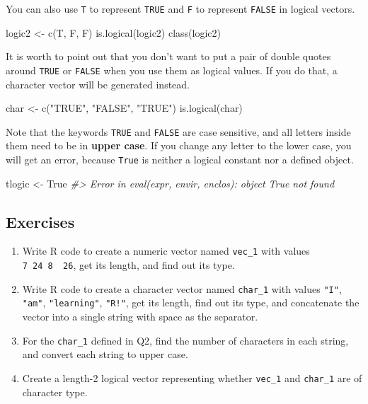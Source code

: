 \documentclass[
]{book}
\newenvironment{Shaded}{\begin{snugshade}}{\end{snugshade}}
\newcommand{\CommentTok}[1]{\textcolor[rgb]{0.56,0.35,0.01}{\textit{#1}}}
\newcommand{\FunctionTok}[1]{\textcolor[rgb]{0.00,0.00,0.00}{#1}}
\newcommand{\NormalTok}[1]{#1}
\newcommand{\OtherTok}[1]{\textcolor[rgb]{0.56,0.35,0.01}{#1}}
\newcommand{\StringTok}[1]{\textcolor[rgb]{0.31,0.60,0.02}{#1}}
\begin{document}
You can also use \texttt{T} to represent \texttt{TRUE} and \texttt{F} to represent \texttt{FALSE} in logical vectors.

\begin{Shaded}
\begin{Highlighting}[]
\NormalTok{logic2 }\OtherTok{\textless{}{-}} \FunctionTok{c}\NormalTok{(T, F, F)}
\FunctionTok{is.logical}\NormalTok{(logic2)}
\FunctionTok{class}\NormalTok{(logic2)}
\end{Highlighting}
\end{Shaded}

It is worth to point out that you don't want to put a pair of double quotes around \texttt{TRUE} or \texttt{FALSE} when you use them as logical values. If you do that, a character vector will be generated instead.

\begin{Shaded}
\begin{Highlighting}[]
\NormalTok{char }\OtherTok{\textless{}{-}} \FunctionTok{c}\NormalTok{(}\StringTok{"TRUE"}\NormalTok{, }\StringTok{"FALSE"}\NormalTok{, }\StringTok{"TRUE"}\NormalTok{)}
\FunctionTok{is.logical}\NormalTok{(char)}
\end{Highlighting}
\end{Shaded}

Note that the keywords \texttt{TRUE} and \texttt{FALSE} are case sensitive, and all letters inside them need to be in \textbf{upper case}. If you change any letter to the lower case, you will get an error, because \texttt{True} is neither a logical constant nor a defined object.

\begin{Shaded}
\begin{Highlighting}[]
\NormalTok{tlogic }\OtherTok{\textless{}{-}}\NormalTok{ True}
\CommentTok{\#\textgreater{} Error in eval(expr, envir, enclos): object \textquotesingle{}True\textquotesingle{} not found}
\end{Highlighting}
\end{Shaded}

\hypertarget{exercises-4}{%
\subsection{Exercises}\label{exercises-4}}

\begin{enumerate}
\def\labelenumi{\arabic{enumi}.}
\item
  Write R code to create a numeric vector named \texttt{vec\_1} with values \texttt{7\ 24\ 8\ \ 26}, get its length, and find out its type.
\item
  Write R code to create a character vector named \texttt{char\_1} with values \texttt{"I"}, \texttt{"am"}, \texttt{"learning"}, \texttt{"R!"}, get its length, find out its type, and concatenate the vector into a single string with space as the separator.
\item
  For the \texttt{char\_1} defined in Q2, find the number of characters in each string, and convert each string to upper case.
\item
  Create a length-2 logical vector representing whether \texttt{vec\_1} and \texttt{char\_1} are of character type.
\end{enumerate}
\end{document}
